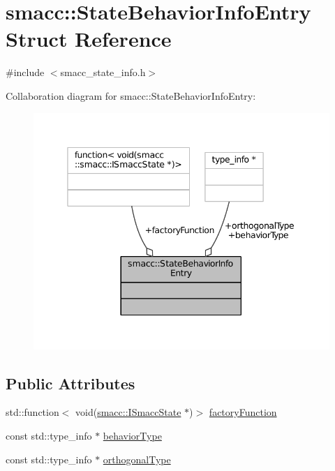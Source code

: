\hypertarget{structsmacc_1_1StateBehaviorInfoEntry}{}\section{smacc\+:\+:State\+Behavior\+Info\+Entry Struct Reference}
\label{structsmacc_1_1StateBehaviorInfoEntry}


{\ttfamily \#include $<$smacc\+\_\+state\+\_\+info.\+h$>$}



Collaboration diagram for smacc\+:\+:State\+Behavior\+Info\+Entry\+:
\nopagebreak
\begin{figure}[H]
\begin{center}
\leavevmode
\includegraphics[width=345pt]{structsmacc_1_1StateBehaviorInfoEntry__coll__graph}
\end{center}
\end{figure}
\subsection*{Public Attributes}
\begin{DoxyCompactItemize}
\item 
std\+::function$<$ void(\hyperlink{classsmacc_1_1ISmaccState}{smacc\+::\+I\+Smacc\+State} $\ast$)$>$ \hyperlink{structsmacc_1_1StateBehaviorInfoEntry_a0af2d6aabb921c95fd723b554cc21aa9}{factory\+Function}
\item 
const std\+::type\+\_\+info $\ast$ \hyperlink{structsmacc_1_1StateBehaviorInfoEntry_a9f77a396b80171e010b3c30778b2f3f0}{behavior\+Type}
\item 
const std\+::type\+\_\+info $\ast$ \hyperlink{structsmacc_1_1StateBehaviorInfoEntry_aefc43616f2bd059594b3b90d6ad47916}{orthogonal\+Type}
\end{DoxyCompactItemize}


